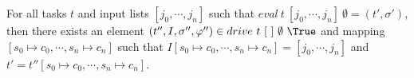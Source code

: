 \begin{theorem}
For all tasks $t$ and input lists $[j_0,\cdots,j_n]$ such that $eval\ t\ [j_0,\cdots,j_n]\ \emptyset = (t',\sigma')$,
then there exists an element $(t'',I,\sigma'',\phi'')\in drive\ t\ [\ ]\ \emptyset\ \True$ and mapping $[s_0\mapsto c_0,\cdots,s_n\mapsto c_n]$ such that
$I[s_0\mapsto c_0,\cdots,s_n\mapsto c_n]=[j_0,\cdots,j_n]$ and $t'=t''[s_0\mapsto c_0,\cdots,s_n\mapsto c_n]$.
  \label{thm:complete}
\end{theorem}
